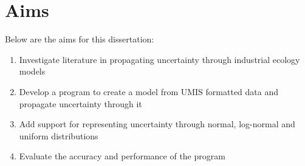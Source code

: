 \documentclass[ %
                    author={Tom Jager},
                supervisor={Dr. Daniel Schien},
                    degree={MEng},
                     title={A Bayesian Inference Engine for UMIS Structured Data},
                  subtitle={},
                      type={research},
                      year={2019} ]{dissertation}
\begin{document}
\section{Aims}
Below are the aims for this dissertation:

\begin{enumerate}
    \item Investigate literature in propagating uncertainty through industrial ecology models
    \item Develop a program to create a model from UMIS formatted data and propagate uncertainty through it
    \item Add support for representing uncertainty through normal, log-normal and uniform distributions
    \item Evaluate the accuracy and performance of the program
\end{enumerate}
\end{document}
